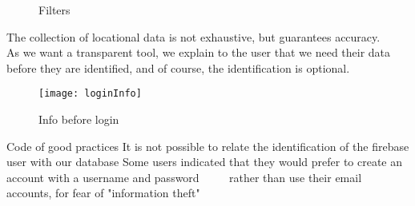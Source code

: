 \begin{figure}[ht]
    \centering
    \hfill
   
  \caption{Filters}
    \end{figure}

    The collection of locational data is not exhaustive, but guarantees accuracy. \\

    As we want a transparent tool, we explain to the user that we need their data before
    they are identified, and of course, the identification is optional. \\

    \begin{figure}[ht]
        \centering
        \texttt{[image: loginInfo]}
        \caption{Info before login}
    \end{figure}

\begin{itemize}
    \done Code of good practices
    \done It is not possible to relate the identification of the firebase user with our database
    \crossed Some users indicated that they would prefer to create an account with a username and password
         rather than use their email accounts, for fear of "information theft"
    
\end{itemize}